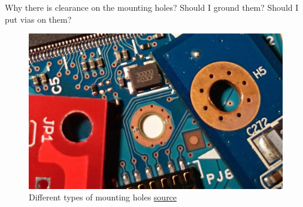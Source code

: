 \documentclass[final]{cubedoc}
\begin{document}
	Why there is clearance on the mounting holes? Should I ground them? Should I put vias on them?
	
	\begin{figure}[h!]
		\centering
		\includegraphics[keepaspectratio, height=.3\textheight, width = \textwidth]{assets/mounting_holes.jpg}
		\caption{Different types of mounting holes \href{https://atadiat.com/en/e-four-pcb-marks/}{source}}
	\end{figure}
	
	
	
	
	
\end{document}
